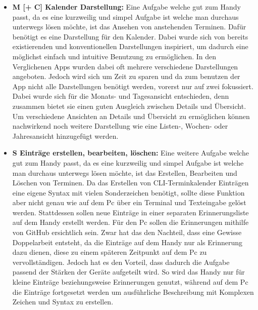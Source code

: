 \begin{itemize}
	\item \textbf{M [+ C] Kalender Darstellung:} %
		Eine Aufgabe welche gut zum Handy passt, da es eine kurzweilig und simpel Aufgabe ist welche man durchaus unterwegs lösen möchte, ist das Ansehen von anstehenden Terminen. Dafür benötigt es eine Darstellung für den Kalender. %
		Dabei wurde sich von bereits existierenden und konventionellen Darstellungen inspiriert, um dadurch eine möglichst einfach und intuitive Benutzung zu ermöglichen. In den Verglichenen Apps wurden dabei oft mehrere verschiedene Darstellungen angeboten. %
		Jedoch wird sich um Zeit zu sparen und da zum benutzen der App nicht alle Darstellungen benötigt werden, vorerst nur auf zwei fokussiert. Dabei wurde sich für die Monats- und Tagesansicht entschieden, denn zusammen bietet sie einen guten Ausgleich zwischen Details und Übersicht.\newline%
		Um verschiedene Ansichten an Details und Übersicht zu ermöglichen können nachwirkend noch weitere Darstellung wie eine Listen-, Wochen- oder Jahresansicht hinzugefügt werden.%

	\item \textbf{S Einträge erstellen, bearbeiten, löschen:} %
		Eine weitere Aufgabe welche gut zum Handy passt, da es eine kurzweilig und simpel Aufgabe ist welche man durchaus unterwegs lösen möchte, ist das Erstellen, Bearbeiten und Löschen von Terminen. %
		Da das Erstellen von CLI-Terminkalender Einträgen eine eigene Syntax mit vielen Sonderzeichen benötigt, sollte diese Funktion aber nicht genau wie auf dem Pc über ein Terminal und Texteingabe gelöst werden. %
		Stattdessen sollen neue Einträge in einer separaten Erinnerungsliste auf dem Handy erstellt werden. Für den Pc sollen die Erinnerungen mithilfe von GitHub ersichtlich sein. %
			Zwar hat das den Nachteil, dass eine Gewisse Doppelarbeit entsteht, da die Einträge auf dem Handy nur als Erinnerung dazu dienen, diese zu einem späteren Zeitpunkt auf dem Pc zu vervollständigen. %
			Jedoch hat es den Vorteil, dass dadurch die Aufgabe passend der Stärken der Geräte aufgeteilt wird. So wird das Handy nur für kleine Einträge beziehungsweise Erinnerungen genutzt, während auf dem Pc die Einträge fortgesetzt werden um ausführliche Beschreibung mit Komplexen Zeichen und Syntax zu erstellen.%
			

\end{itemize}
